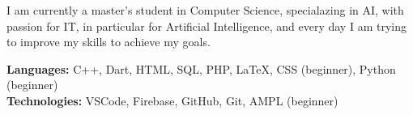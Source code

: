 \documentclass[9pt]{developercv} %
\begin{document}
\vspace{0.5cm}


\begin{minipage}[t]{0.4\textwidth} %
	\vspace{-\baselineskip} %
	I am currently a master's student in Computer Science, specialazing in AI, with passion for IT, in particular for Artificial Intelligence, and every day I am trying to improve my skills to achieve my goals.
\end{minipage}
\hfill %
\begin{minipage}[t]{0.5\textwidth} %
	\vspace{-\baselineskip} %
		\textbf{Languages:} C++, Dart, HTML, SQL, PHP, LaTeX, CSS (beginner), Python (beginner) \\

		\textbf{Technologies:} VSCode, Firebase, GitHub, Git, AMPL (beginner)
\end{minipage}

\vspace{0.5cm}



\end{document}
